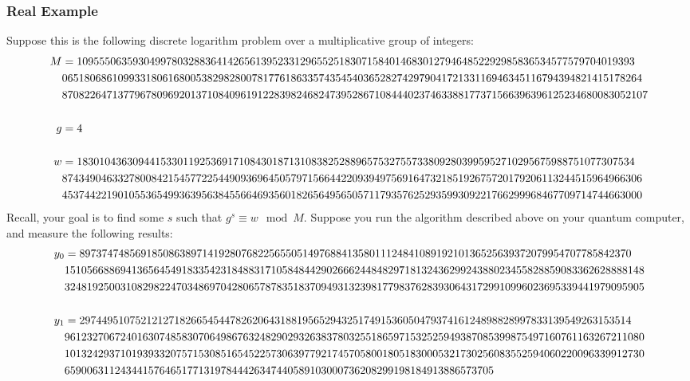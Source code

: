 \subsubsection{Real Example}
Suppose this is the following discrete logarithm problem over a multiplicative group of integers:
\begin{align}
    M &= 1095550635930499780328836414265613952331296552518307158401468301279464852292985836534577579704019393 \notag \\
    &06518068610993318061680053829828007817761863357435454036528274297904172133116946345116794394821415178264 \notag \\
    &870822647137796780969201371084096191228398246824739528671084440237463388177371566396396125234680083052107 \\
    \notag \\
    g &= 4 \\
    \notag \\
    w &= 1830104363094415330119253691710843018713108382528896575327557338092803995952710295675988751077307534 \notag \\
    &87434904633278008421545772254490936964505797156644220939497569164732185192675720179206113244515964966306 \notag \\
    &45374422190105536549936395638455664693560182656495650571179357625293599309221766299968467709714744663000
\end{align}
Recall, your goal is to find some $s$ such that $g^s \equiv w \mod M$. Suppose you run the algorithm described above on your quantum computer, and measure the following results: 
\begin{align}
    y_0 &= 897374748569185086389714192807682256550514976884135801112484108919210136525639372079954707785842370 \notag \\
    &15105668869413656454918335423184883171058484429026662448482971813243629924388023455828859083362628888148 \notag \\
    &32481925003108298224703486970428065787835183709493132398177983762839306431729910996023695339441979095905 \\
    \notag \\
    y_1 &= 297449510752121271826654544782620643188195652943251749153605047937416124898828997833139549263153514 \notag \\
    &96123270672401630748583070649867632482902932638378032551865971532525949387085399875497160761163267211080 \notag \\
    &10132429371019393320757153085165452257306397792174570580018051830005321730256083552594060220096339912730 \notag \\
    &65900631124344157646517713197844426347440589103000736208299198184913886573705
\end{align}

